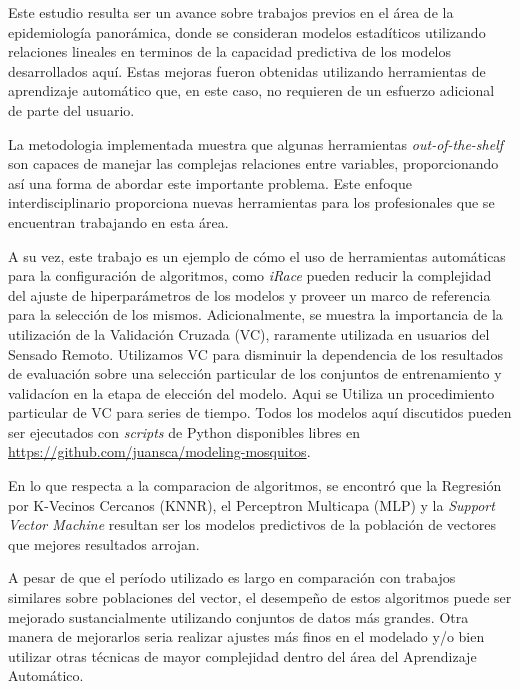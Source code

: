   \par Este estudio resulta ser un avance sobre trabajos previos en el área
    de la epidemiología panorámica, donde se consideran modelos estadíticos utilizando
    relaciones lineales \cite{models_predicting, modis_data, ndwi_erffectiveness}
    en terminos de la capacidad predictiva de los modelos desarrollados aquí.
    Estas mejoras fueron obtenidas utilizando herramientas de aprendizaje
    automático que, en este caso, no requieren de un esfuerzo adicional de
    parte del usuario.

  \par La metodologia implementada muestra que algunas herramientas \textit{out-of-the-shelf}
    son capaces de manejar las complejas relaciones entre variables, proporcionando
    así una forma de abordar este importante problema. Este enfoque interdisciplinario
    proporciona nuevas herramientas para los profesionales que se encuentran
    trabajando en esta área.

  \par A su vez, este trabajo es un ejemplo de cómo el uso de herramientas
    automáticas para la configuración de algoritmos, como \textit{iRace} pueden
    reducir la complejidad del ajuste de hiperparámetros de los modelos y
    proveer un marco de referencia para la selección de los mismos.
    Adicionalmente, se muestra la importancia de la utilización de la Validación
    Cruzada (VC), raramente utilizada en usuarios del Sensado Remoto.
    Utilizamos VC para disminuir la dependencia de los resultados de evaluación
    sobre una selección particular de los conjuntos de entrenamiento y validacíon
    en la etapa de elección del modelo. Aqui se Utiliza
    un procedimiento particular de VC para series de tiempo. Todos los modelos
    aquí discutidos pueden ser ejecutados con \textit{scripts} de Python
    disponibles libres en \url{https://github.com/juansca/modeling-mosquitos}.

  \par En lo que respecta a la comparacion de algoritmos, se encontró que la Regresión
    por K-Vecinos Cercanos (KNNR), el Perceptron Multicapa (MLP) y la
    \textit{Support Vector Machine} resultan ser los modelos predictivos de la
    población de vectores que mejores resultados arrojan.


  \par A pesar de que el período utilizado es largo en comparación con trabajos similares
    sobre poblaciones del vector, el desempeño de estos algoritmos puede ser
    mejorado sustancialmente utilizando conjuntos de datos más grandes.
    Otra manera de mejorarlos seria realizar ajustes más finos en el modelado
    y/o bien utilizar otras técnicas de mayor complejidad dentro del área del
    Aprendizaje Automático.

